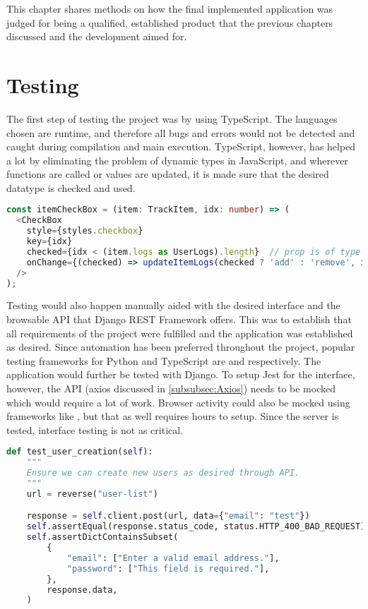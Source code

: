 \documentclass[../main.tex]{subfiles}
\begin{document}
This chapter shares methods on how the final implemented application was judged for being a qualified, established product that the previous chapters discussed and the development aimed for.

\section{Testing}

The first step of testing the project was by using TypeScript. The languages chosen are runtime, and therefore all bugs and errors would not be detected and caught during compilation and main execution. TypeScript, however, has helped a lot by eliminating the problem of dynamic types in JavaScript, and wherever functions are called or values are updated, it is made sure that the desired datatype is checked and used.

\begin{lstlisting}[language=typescript,caption={Type assertions in \citecode{srchomepagetsx}}]
const itemCheckBox = (item: TrackItem, idx: number) => (
  <CheckBox
    style={styles.checkbox}
    key={idx}
    checked={idx < (item.logs as UserLogs).length}  // prop is of type UserLogs
    onChange={(checked) => updateItemLogs(checked ? 'add' : 'remove', item)}
  />
);
\end{lstlisting}

Testing would also happen manually aided with the desired interface and the browsable API that Django REST Framework offers. This was to establish that all requirements of the project were fulfilled and the application was established as desired. Since automation has been preferred throughout the project, popular testing frameworks for Python and TypeScript are  and  respectively. The application would further be tested with Django. To setup Jest for the interface, however, the API (axios discussed in \ref{subsubsec:Axios}) needs to be mocked which would require a lot of work. Browser activity could also be mocked using frameworks like , but that as well requires hours to setup. Since the server is tested, interface testing is not as critical.

\begin{lstlisting}[language=python,caption={Testing registration API for security in \citecode{resttestpy}}]
def test_user_creation(self):
    """
    Ensure we can create new users as desired through API.
    """
    url = reverse("user-list")

    response = self.client.post(url, data={"email": "test"})
    self.assertEqual(response.status_code, status.HTTP_400_BAD_REQUEST)
    self.assertDictContainsSubset(
        {
            "email": ["Enter a valid email address."],
            "password": ["This field is required."],
        },
        response.data,
    )
\end{lstlisting}
\end{document}
